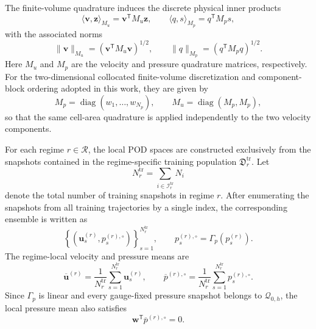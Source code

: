 The finite-volume quadrature induces the discrete physical inner products
\begin{equation}
\langle \boldsymbol{v},\boldsymbol{z}\rangle_{M_u} = \boldsymbol{v}^{\mathsf T}M_u\boldsymbol{z},
\qquad
\langle q,s\rangle_{M_p} = q^{\mathsf T}M_p s,
\label{eq:weighted_inner_products}
\end{equation}
with the associated norms
\begin{equation}
\|\boldsymbol{v}\|_{M_u} = \left( \boldsymbol{v}^{\mathsf T}M_u\boldsymbol{v} \right)^{1/2},
\qquad
\|q\|_{M_p} = \left( q^{\mathsf T}M_pq \right)^{1/2}.
\label{eq:weighted_discrete_norms}
\end{equation}
Here $M_u$ and $M_p$ are the velocity and pressure quadrature matrices,
respectively.  For the two-dimensional collocated finite-volume
discretization and component-block ordering adopted in this work, they are
given by
\begin{equation}
M_p = \operatorname{diag}(w_1,\ldots,w_{N_p}),
\qquad
M_u = \operatorname{diag}(M_p,M_p),
\label{eq:velocity_pressure_mass_matrices}
\end{equation}
so that the same cell-area quadrature is applied independently to the two
velocity components.

For each regime $r\in\mathcal{R}$, the local POD spaces are constructed
exclusively from the snapshots contained in the regime-specific training
population $\mathfrak{D}_{r}^{\mathrm{tr}}$.  Let
\begin{equation}
N_r^{\mathrm{tr}} = \sum_{i\in\mathcal{I}_{r}^{\mathrm{tr}}}N_i
\label{eq:number_regime_training_snapshots}
\end{equation}
denote the total number of training snapshots in regime $r$.  After
enumerating the snapshots from all training trajectories by a single index,
the corresponding ensemble is written as
\begin{equation}
\left\{
\left(
\boldsymbol{u}^{(r)}_s,
p^{(r),\circ}_s
\right)
\right\}_{s=1}^{N_r^{\mathrm{tr}}},
\qquad
p^{(r),\circ}_s = \Gamma_p\left(p^{(r)}_s\right).
\label{eq:regime_training_snapshot_ensemble}
\end{equation}
The regime-local velocity and pressure means are
\begin{equation}
\overline{\boldsymbol{u}}^{(r)} = \frac{1}{N_r^{\mathrm{tr}}}
\sum_{s=1}^{N_r^{\mathrm{tr}}}
\boldsymbol{u}^{(r)}_s,
\qquad
\overline{p}^{(r),\circ} = \frac{1}{N_r^{\mathrm{tr}}}
\sum_{s=1}^{N_r^{\mathrm{tr}}}
p^{(r),\circ}_s.
\label{eq:local_training_means}
\end{equation}
Since $\Gamma_p$ is linear and every gauge-fixed pressure snapshot belongs
to $\mathcal{Q}_{0,h}$, the local pressure mean also satisfies
\begin{equation}
\boldsymbol{w}^{\mathsf T} \overline{p}^{(r),\circ} = 0.
\label{eq:local_pressure_mean_gauge}
\end{equation}

